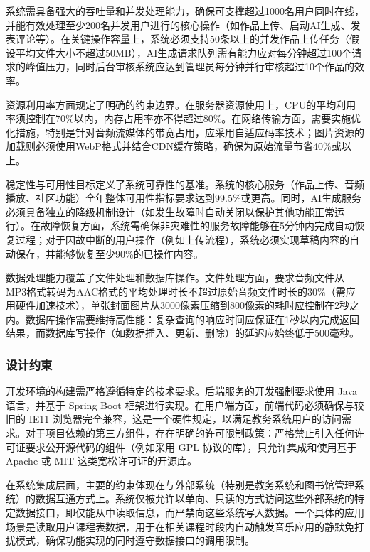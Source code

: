 \documentclass{base}
\begin{document}
系统需具备强大的吞吐量和并发处理能力，确保可支撑超过1000名用户同时在线，并能有效处理至少200名并发用户进行的核心操作（如作品上传、启动AI生成、发表评论等）。在关键操作容量上，系统必须支持50条以上的并发作品上传任务（假设平均文件大小不超过50MB），AI生成请求队列需有能力应对每分钟超过100个请求的峰值压力，同时后台审核系统应达到管理员每分钟并行审核超过10个作品的效率。

资源利用率方面规定了明确的约束边界。在服务器资源使用上，CPU的平均利用率须控制在70\%以内，内存占用率亦不得超过80\%。在网络传输方面，需要实施优化措施，特别是针对音频流媒体的带宽占用，应采用自适应码率技术；图片资源的加载则必须使用WebP格式并结合CDN缓存策略，确保为原始流量节省40\%或以上。

稳定性与可用性目标定义了系统可靠性的基准。系统的核心服务（作品上传、音频播放、社区功能）全年整体可用性指标要求达到99.5\%或更高。同时，AI生成服务必须具备独立的降级机制设计（如发生故障时自动关闭以保护其他功能正常运行）。在故障恢复方面，系统需确保非灾难性的服务故障能够在5分钟内完成自动恢复过程；对于因故中断的用户操作（例如上传流程），系统必须实现草稿内容的自动保存，并能够恢复至少90\%的已操作内容。

数据处理能力覆盖了文件处理和数据库操作。文件处理方面，要求音频文件从MP3格式转码为AAC格式的平均处理时长不超过原始音频文件时长的30\%（需应用硬件加速技术），单张封面图片从3000像素压缩到800像素的耗时应控制在2秒之内。数据库操作需要维持高性能：复杂查询的响应时间应保证在1秒以内完成返回结果，而数据库写操作（如数据插入、更新、删除）的延迟应始终低于500毫秒。

\subsubsection{设计约束}

开发环境的构建需严格遵循特定的技术要求。后端服务的开发强制要求使用 Java 语言，并基于 Spring Boot 框架进行实现。在用户端方面，前端代码必须确保与较旧的 IE11 浏览器完全兼容，这是一个硬性规定，以满足教务系统用户的访问需求。对于项目依赖的第三方组件，存在明确的许可限制政策：严格禁止引入任何许可证要求公开源代码的组件（例如采用 GPL 协议的库），只允许集成和使用基于 Apache 或 MIT 这类宽松许可证的开源库。

在系统集成层面，主要的约束体现在与外部系统（特别是教务系统和图书馆管理系统）的数据互通方式上。系统仅被允许以单向、只读的方式访问这些外部系统的特定数据接口，即仅能从中读取信息，而严禁向这些系统写入数据。一个具体的应用场景是读取用户课程表数据，用于在相关课程时段内自动触发音乐应用的静默免打扰模式，确保功能实现的同时遵守数据接口的调用限制。
\end{document}
